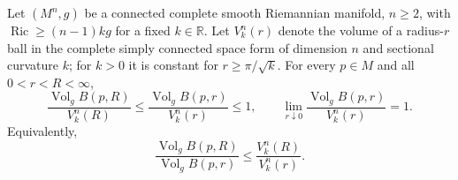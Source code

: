 Let \((M^n,g)\) be a connected complete smooth Riemannian manifold, \(n\ge2\), with \(\operatorname{Ric}\ge(n-1)k g\) for a fixed \(k\in\mathbb R\). Let \(V_k^n(r)\) denote the volume of a radius-\(r\) ball in the complete simply connected space form of dimension \(n\) and sectional curvature \(k\); for \(k>0\) it is constant for \(r\ge\pi/\sqrt{k}\).
For every \(p\in M\) and all \(0<r<R<\infty\),
\[
\frac{\operatorname{Vol}_g B(p,R)}{V_k^n(R)}
\le \frac{\operatorname{Vol}_g B(p,r)}{V_k^n(r)}\le1,
\qquad
\lim_{r\downarrow0}\frac{\operatorname{Vol}_g B(p,r)}{V_k^n(r)}=1.
\]
Equivalently,
\[
\frac{\operatorname{Vol}_g B(p,R)}{\operatorname{Vol}_g B(p,r)}\le\frac{V_k^n(R)}{V_k^n(r)}.
\]
